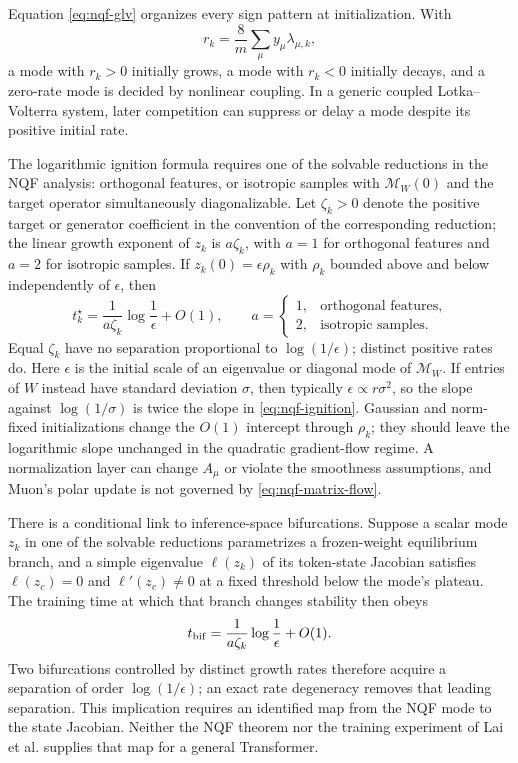 \documentclass[11pt,a4paper]{article}
\theoremstyle{definition}
\begin{document}
Equation \eqref{eq:nqf-glv} organizes every sign pattern at initialization.  With
\begin{equation}
 r_k=\frac8m\sum_\mu y_\mu\lambda_{\mu,k},
 \label{eq:nqf-growth}
\end{equation}
a mode with $r_k>0$ initially grows, a mode with $r_k<0$ initially decays, and a
zero-rate mode is decided by nonlinear coupling.  In a generic coupled
Lotka--Volterra system, later competition can suppress or delay a mode despite its
positive initial rate.

The logarithmic ignition formula requires one of the solvable reductions in the NQF
analysis: orthogonal features, or isotropic samples with $\mathcal M_W(0)$ and the
target operator simultaneously diagonalizable.  Let $\zeta_k>0$ denote the positive
target or generator coefficient in the convention of the corresponding reduction;
the linear growth exponent of $z_k$ is $a\zeta_k$, with $a=1$ for orthogonal features
and $a=2$ for isotropic samples.  If
$z_k(0)=\epsilon\rho_k$ with $\rho_k$ bounded above and below independently of
$\epsilon$, then
\begin{equation}
 t_k^\star=\frac1{a\zeta_k}\log\frac1\epsilon+O(1),
 \qquad
 a=\begin{cases}1,&\text{orthogonal features},\\2,&\text{isotropic samples}.
 \end{cases}
 \label{eq:nqf-ignition}
\end{equation}
Equal $\zeta_k$ have no separation proportional to $\log(1/\epsilon)$; distinct
positive rates do.  Here $\epsilon$ is the initial scale of an eigenvalue or diagonal
mode of $\mathcal M_W$.  If entries of $W$ instead have standard deviation $\sigma$,
then typically $\epsilon\propto r\sigma^2$, so the slope against
$\log(1/\sigma)$ is twice the slope in \eqref{eq:nqf-ignition}.
Gaussian and norm-fixed initializations change the $O(1)$ intercept through
$\rho_k$; they should leave the logarithmic slope unchanged in the quadratic
gradient-flow regime.  A normalization layer can change $A_\mu$ or violate the
smoothness assumptions, and Muon's polar update is not governed by
\eqref{eq:nqf-matrix-flow}.

There is a conditional link to inference-space bifurcations.  Suppose a scalar mode
$z_k$ in one of the solvable reductions parametrizes a frozen-weight equilibrium
branch, and a simple eigenvalue $\ell(z_k)$ of its token-state Jacobian satisfies
$\ell(z_c)=0$ and $\ell'(z_c)\ne0$ at a fixed threshold below the mode's plateau.
The training time at which that branch changes stability then obeys
\begin{equation}
 t_{\rm bif}=\frac{1}{a\zeta_k}\log\frac1\epsilon+O(1).
 \label{eq:nqf-bifurcation-clock}
\end{equation}
Two bifurcations controlled by distinct growth rates therefore acquire a separation
of order $\log(1/\epsilon)$; an exact rate degeneracy removes that leading
separation.  This implication requires an identified map from the NQF mode to the
state Jacobian.  Neither the NQF theorem nor the training experiment of Lai et al.
supplies that map for a general Transformer.
\end{document}
